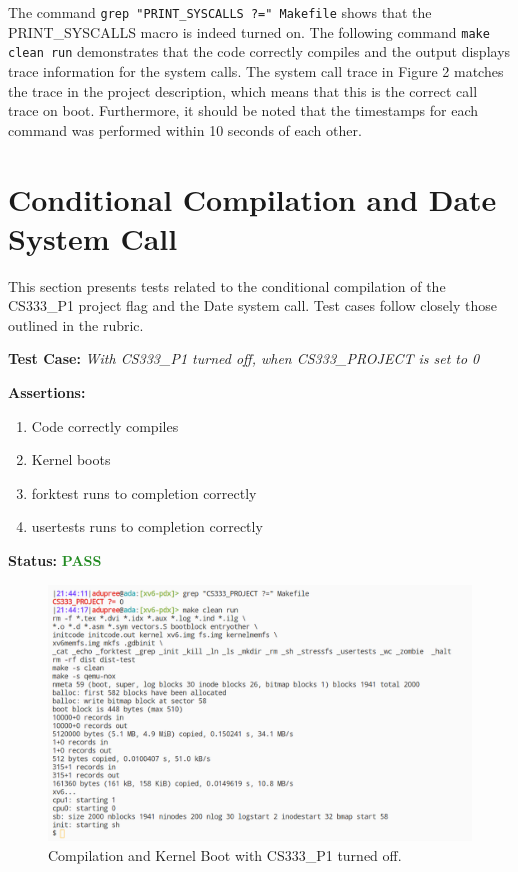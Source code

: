 \documentclass[11pt,letterpaper]{report}
\newcommand{\code}[1]{\colorbox{codegray}{\texttt{#1}}}
\begin{document}
{  \pagebreak

  The command \code{grep "PRINT\_SYSCALLS ?=" Makefile} shows that the PRINT\_SYSCALLS macro is indeed turned on.
  The following command \code{make clean run} demonstrates that the code correctly compiles and the output displays
  trace information for the system calls. The system call trace in Figure 2 matches the trace in the project description, which means that this is the correct call trace on boot.
  Furthermore, it should be noted that the timestamps for each command was performed within 10 seconds of each other.

  \pagebreak

  \section*{Conditional Compilation and Date System Call}
  This section presents tests related to the conditional compilation of the CS333\_P1 project flag and the Date system call.
  Test cases follow closely those outlined in the rubric. \hfill \break
  
  \noindent\textbf{Test Case:} \emph{With CS333\_P1 turned off, when CS333\_PROJECT is set to 0}
  
  \noindent\textbf{Assertions:}
  \begin{enumerate}[]
  \item Code correctly compiles
  \item Kernel boots
  \item forktest runs to completion correctly
  \item usertests runs to completion correctly
  \end{enumerate}  
  
  \noindent\textbf{Status:} \textcolor{ForestGreen}{\textbf{PASS}}
  
  \begin{figure}[h!]
	\centering
	\includegraphics[width=1\linewidth]{test3.png}
	\caption[PRINT\_SYSCALLS=0]{Compilation and Kernel Boot with CS333\_P1 turned off.}
	\label{fig:P1compileP0-1}
  \end{figure}

}
\end{document}
